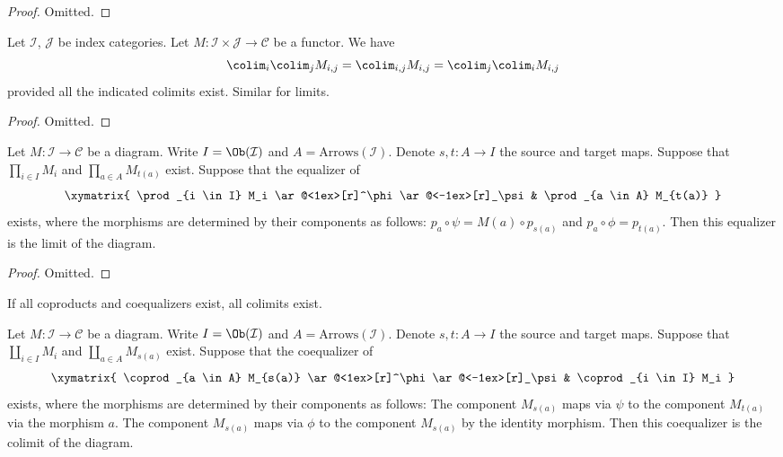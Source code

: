 \begin{proof}
Omitted.
\end{proof}


\begin{lemma}
\label{lemma-colimits-commute}
Let $\mathcal{I}$, $\mathcal{J}$ be index categories.
Let $M : \mathcal{I} \times \mathcal{J} \to \mathcal{C}$ be a functor.
We have
$$
\colim_i \colim_j M_{i, j}
=
\colim_{i, j} M_{i, j}
=
\colim_j \colim_i M_{i, j}
$$
provided all the indicated colimits exist. Similar for limits.
\end{lemma}

\begin{proof}
Omitted.
\end{proof}

\begin{lemma}
\label{lemma-limits-products-equalizers}
Let $M : \mathcal{I} \to \mathcal{C}$ be a diagram.
Write $I = \Ob(\mathcal{I})$ and $A = \text{Arrows}(\mathcal{I})$.
Denote $s, t : A \to I$ the source and target maps.
Suppose that $\prod_{i \in I} M_i$ and $\prod_{a \in A} M_{t(a)}$
exist. Suppose that the equalizer of
$$
\xymatrix{
\prod_{i \in I} M_i
\ar@<1ex>[r]^\phi \ar@<-1ex>[r]_\psi
&
\prod_{a \in A} M_{t(a)}
}
$$
exists, where the morphisms are determined by their components
as follows: $p_a \circ \psi = M(a) \circ p_{s(a)}$
and $p_a \circ \phi = p_{t(a)}$. Then this equalizer is the
limit of the diagram.
\end{lemma}

\begin{proof}
Omitted.
\end{proof}


\begin{lemma}
\label{lemma-colimits-coproducts-coequalizers}
\begin{slogan}
If all coproducts and coequalizers exist, all colimits exist.
\end{slogan}
Let $M : \mathcal{I} \to \mathcal{C}$ be a diagram.
Write $I = \Ob(\mathcal{I})$ and $A = \text{Arrows}(\mathcal{I})$.
Denote $s, t : A \to I$ the source and target maps.
Suppose that $\coprod_{i \in I} M_i$ and $\coprod_{a \in A} M_{s(a)}$
exist. Suppose that the coequalizer of
$$
\xymatrix{
\coprod_{a \in A} M_{s(a)}
\ar@<1ex>[r]^\phi \ar@<-1ex>[r]_\psi
&
\coprod_{i \in I} M_i
}
$$
exists, where the morphisms are determined by their components
as follows: The component $M_{s(a)}$ maps via $\psi$
to the component $M_{t(a)}$ via the morphism $a$.
The component $M_{s(a)}$ maps via $\phi$ to the component
$M_{s(a)}$ by the identity morphism. Then this coequalizer is the
colimit of the diagram.
\end{lemma}

